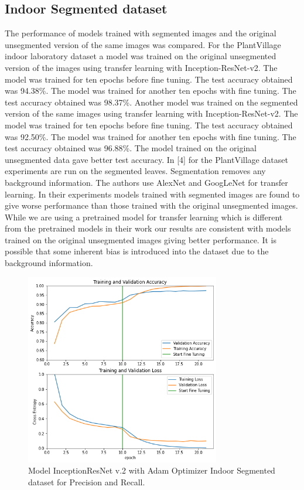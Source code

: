 \documentclass[conference]{IEEEtran}
\begin{document}
\subsection{Indoor Segmented dataset}
The performance of models trained with segmented images and the original unsegmented version of the same images was compared. For the PlantVillage indoor laboratory dataset a model was trained on the original unsegmented version of the images using transfer learning with Inception-ResNet-v2. The model was trained for ten epochs before fine tuning. The test accuracy obtained was 94.38\%. The model was trained for another ten epochs with fine tuning. The test accuracy obtained was 98.37\%. Another model was trained on the segmented version of the same images using transfer learning with Inception-ResNet-v2. The model was trained for ten epochs before fine tuning. The test accuracy obtained was 92.50\%. The model was trained for another ten epochs with fine tuning. The test accuracy obtained was 96.88\%. The model trained on the original unsegmented data gave better test accuracy. In [4] for the PlantVillage dataset experiments are run on the segmented leaves. Segmentation removes any background information. The authors use AlexNet and GoogLeNet for transfer learning. In their experiments models trained with segmented images are found to give worse performance than those trained with the original unsegmented images. While we are using a pretrained model for transfer learning which is different from the pretrained models in their work our results are consistent with models trained on the original unsegmented images giving better performance. It is possible that some inherent bias is introduced into the dataset due to the background information.  \ 
\begin{figure}[htbp]
\centerline{\includegraphics[width=8.5cm]{ModelIndoorsResNetEpochsSegmentedAccuracychart_new.png}}
\caption{Model InceptionResNet v.2 with Adam Optimizer Indoor Segmented dataset for Precision and Recall.}
\label{fig}
\end{figure}
 
\end{document}
